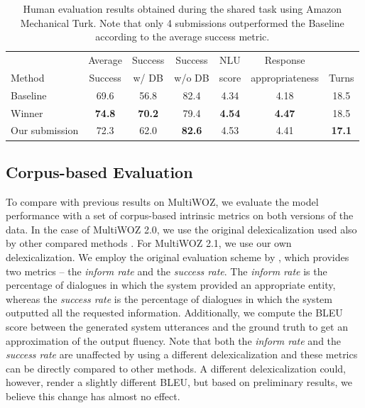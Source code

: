 \documentclass[11pt,a4paper]{article}
\begin{document}
\begin{table}[t]
    \centering\small
    \begin{tabular}{lcccccc}
      \toprule
      & Average & Success & Success  & NLU &  Response & \\
      Method & Success & w/ DB & w/o DB & score & appropriateness & Turns \\
      \midrule
      Baseline & 69.6 & 56.8 & 82.4 & 4.34 & 4.18 & 18.5 \\
      Winner & \textbf{74.8} & \textbf{70.2} & 79.4 & \textbf{4.54 }& \textbf{4.47} & 18.5 \\
      Our submission & 72.3 & 62.0 & \textbf{82.6} & 4.53 & 4.41 & \textbf{17.1} \\
      \bottomrule
    \end{tabular}
    \caption{Human evaluation results obtained during the shared task using Amazon Mechanical Turk. Note that only 4 submissions outperformed the Baseline according to the average success metric.}
    \label{tab:human}
\end{table}

\subsection{Corpus-based Evaluation}
\label{sec:corpus-based}

To compare with previous results on MultiWOZ, we evaluate the model performance with a set of corpus-based intrinsic metrics on both versions of the data.
In the case of MultiWOZ 2.0, we use the original delexicalization used also by other compared methods \cite{peng2020,hosseini2020,zhang2019}. For MultiWOZ 2.1, we use our own delexicalization.
We employ the original evaluation scheme by \citet{budzianowski2018}, which provides two metrics -- the \emph{inform rate} and the \emph{success rate}. The \emph{inform rate} is the percentage of dialogues in which the system provided an appropriate entity, whereas the \emph{success rate} is the percentage of dialogues in which the system outputted all the requested information. Additionally, we compute the BLEU score \cite{papineni2002} between the generated system utterances and the ground truth to get an approximation of the output fluency.
Note that both the \emph{inform rate} and the \emph{success rate} are unaffected by using a different delexicalization and these metrics can be directly compared to other methods. A different delexicalization could, however, render a slightly different BLEU, but based on preliminary results, we believe this change has almost no effect.
\end{document}
